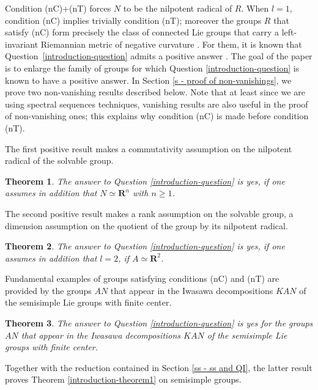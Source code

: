 \documentclass[JEP,XML,SOM,Unicode,published]{cedram}
\newcommand{\RR}{\mathbf{R}}
\theoremstyle{plain}
\newtheorem{maintheorem}{Theorem}
\theoremstyle{remark}
\theoremstyle{definition}
\begin{document}
Condition (nC)+(nT) forces $N$ to be the nilpotent radical of $R$.
When $l=1$, condition (nC) implies trivially condition (nT); moreover the groups $R$ that satisfy (nC) form precisely the class of connected Lie groups that carry a left-invariant Riemannian
metric of negative curvature \cite{Hze}.
For them, it is known that Question~\ref{introduction-question} admits a positive answer \cite{P2, CT}.
The goal of the paper is to enlarge the family of groups for which Question \ref{introduction-question} is known to have a positive answer.
In Section \ref{s - proof of non-vanishings}, we prove two non-vanishing results described below.
Note that at least since we are using spectral sequences techniques, vanishing results are also useful in the proof of non-vanishing ones; this explains why condition (nC) is made before condition (nT).

The first positive result makes a commutativity assumption on the nilpotent radical of the solvable group.

\begin{maintheorem}
\label{introduction-theorem2}
The answer to Question \ref{introduction-question} is yes, if one assumes in addition that
$N \simeq \RR^n$ with $n \geqslant 1$.
\end{maintheorem}

The second positive result makes a rank assumption on the solvable group, \ie a dimension assumption on the quotient of the group by its nilpotent radical.

\begin{maintheorem}
\label{introduction-theorem3}
The answer to Question \ref{introduction-question} is yes, if one assumes in addition that
$l=2$, \ie if $A \simeq \RR^2$.
\end{maintheorem}

Fundamental examples of groups satisfying conditions (nC) and (nT) are provided by the groups $AN$ that appear in the Iwasawa
decompositions $KAN$ of the semisimple Lie groups with finite center.

\begin{maintheorem}
\label{introduction-theorem4}
The answer to Question \ref{introduction-question} is yes for the groups $AN$ that appear in the Iwasawa decompositions $KAN$ of the semisimple Lie groups with finite center.
\end{maintheorem}

Together with the reduction contained in Section \ref{ss - ss and QI}, the latter result proves Theorem \ref{introduction-theorem1} on semisimple groups.
\end{document}
